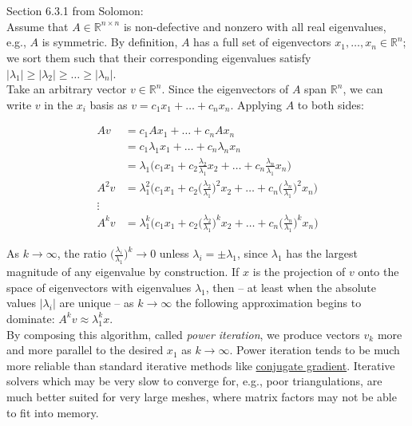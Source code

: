 \documentclass{article}
\newcommand\ifrac[2]{{\displaystyle\frac{#1}{#2}}}
\def\R{\mathbb{R}}
\def\R{\mathbb{R}}
\begin{document}
\vspace{1.8cm}
\\\\

Section 6.3.1 from Solomon:\\

Assume that $A \in \R^{n \times n}$ is non-defective and nonzero with all real eigenvalues,
e.g., $A$ is symmetric. By definition, $A$ has a full set of eigenvectors $x_1,\dots,x_n \in \R^n$; 
we sort them such that their corresponding eigenvalues satisfy $|\lambda_1| \ge |\lambda_2| \ge \dots \ge |\lambda_n|$.\\

Take an arbitrary vector $v \in \R^n$. Since the eigenvectors of $A$ span $\R^n$, we can write
$v$ in the $x_i$ basis as $v = c_1x_1 + \dots + c_nx_n$. Applying $A$ to both sides:

\begin{align*}
    Av &= c_1Ax_1 + \dots + c_nAx_n \\
        &= c_1\lambda_1x_1 + \dots + c_n\lambda_nx_n \tag*{since $Ax_i = \lambda_i x_i$} \\
        &= \lambda_1 \Big( c_1x_1 + c_2\frac{\lambda_2}{\lambda_1}x_2 + \dots + c_n\frac{\lambda_n}{\lambda_1}x_n \Big) \\
    A^2v &= \lambda_1^2 \Big(c_1x_1 + c_2\Big(\frac{\lambda_2}{\lambda_1}\Big)^2x_2 + \dots + c_n\Big(\frac{\lambda_n}{\lambda_1}\Big)^2x_n \Big) \\
    \vdots \\
    A^kv &= \lambda_1^k \Big(c_1x_1 + c_2\Big(\frac{\lambda_2}{\lambda_1}\Big)^kx_2 + \dots + c_n\Big(\frac{\lambda_n}{\lambda_1}\Big)^kx_n \Big)
\end{align*}

As $k \rightarrow \infty$, the ratio $\Big(\ifrac{\lambda_i}{\lambda_1}\Big)^k \rightarrow 0$ unless $\lambda_i = \pm \lambda_1$,
since $\lambda_1$ has the largest magnitude of any eigenvalue by construction. If $x$ is the projection of $v$ onto the space
of eigenvectors with eigenvalues $\lambda_1$, then -- at least when the absolute values $|\lambda_i|$ are unique --
as $k \rightarrow \infty$ the following approximation begins to dominate: $A^kv \approx \lambda_1^kx$.\\

By composing this algorithm, called \emph{power iteration}, we produce vectors $v_k$ more and more parallel
to the desired $x_1$ as $k \rightarrow \infty$. Power iteration tends to be much more reliable than standard iterative
methods like \href{https://www.cs.cmu.edu/~quake-papers/painless-conjugate-gradient.pdf}{conjugate gradient}.
Iterative solvers which may be very slow to converge for, e.g., poor triangulations,
are much better suited for very large meshes, where matrix factors may not be able to fit into memory. 
\end{document}
